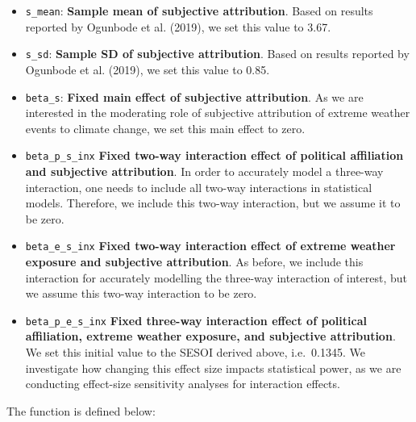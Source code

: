 \documentclass[
  letterpaper,
  DIV=11,
  numbers=noendperiod]{scrartcl}
\begin{document}
\begin{itemize}
\item
  \texttt{s\_mean}: \textbf{Sample mean of subjective attribution}.
  Based on results reported by Ogunbode et al. (2019), we set this value
  to 3.67.
\item
  \texttt{s\_sd}: \textbf{Sample SD of subjective attribution}. Based on
  results reported by Ogunbode et al. (2019), we set this value to 0.85.
\item
  \texttt{beta\_s}: \textbf{Fixed main effect of subjective
  attribution}. As we are interested in the moderating role of
  subjective attribution of extreme weather events to climate change, we
  set this main effect to zero.
\item
  \texttt{beta\_p\_s\_inx} \textbf{Fixed two-way interaction effect of
  political affiliation and subjective attribution}. In order to
  accurately model a three-way interaction, one needs to include all
  two-way interactions in statistical models. Therefore, we include this
  two-way interaction, but we assume it to be zero.
\item
  \texttt{beta\_e\_s\_inx} \textbf{Fixed two-way interaction effect of
  extreme weather exposure and subjective attribution}. As before, we
  include this interaction for accurately modelling the three-way
  interaction of interest, but we assume this two-way interaction to be
  zero.
\item
  \texttt{beta\_p\_e\_s\_inx} \textbf{Fixed three-way interaction effect
  of political affiliation, extreme weather exposure, and subjective
  attribution}. We set this initial value to the SESOI derived above,
  i.e.~0.1345. We investigate how changing this effect size impacts
  statistical power, as we are conducting effect-size sensitivity
  analyses for interaction effects.
\end{itemize}

The function is defined below:
\end{document}
